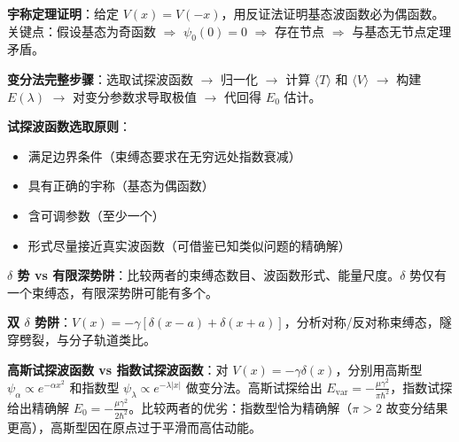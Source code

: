\begin{drillbox}[训练点与考法变体]
 \textbf{宇称定理证明}：给定 $V(x)=V(-x)$，用反证法证明基态波函数必为偶函数。关键点：假设基态为奇函数 $\Rightarrow$ $\psi_0(0)=0$ $\Rightarrow$ 存在节点 $\Rightarrow$ 与基态无节点定理矛盾。

 \textbf{变分法完整步骤}：选取试探波函数 $\to$ 归一化 $\to$ 计算 $\langle T\rangle$ 和 $\langle V\rangle$ $\to$ 构建 $E(\lambda)$ $\to$ 对变分参数求导取极值 $\to$ 代回得 $E_0$ 估计。

 \textbf{试探波函数选取原则}：
\begin{itemize}[nosep]
    \item 满足边界条件（束缚态要求在无穷远处指数衰减）
    \item 具有正确的宇称（基态为偶函数）
    \item 含可调参数（至少一个）
    \item 形式尽量接近真实波函数（可借鉴已知类似问题的精确解）
\end{itemize}

 \textbf{$\delta$ 势 vs 有限深势阱}：比较两者的束缚态数目、波函数形式、能量尺度。$\delta$ 势仅有一个束缚态，有限深势阱可能有多个。

 \textbf{双 $\delta$ 势阱}：$V(x)=-\gamma[\delta(x-a)+\delta(x+a)]$，分析对称/反对称束缚态，隧穿劈裂，与分子轨道类比。

 \textbf{高斯试探波函数 vs 指数试探波函数}：对 $V(x)=-\gamma\delta(x)$，分别用高斯型 $\psi_\alpha\propto e^{-\alpha x^2}$ 和指数型 $\psi_\lambda\propto e^{-\lambda|x|}$ 做变分法。高斯试探给出 $E_{\text{var}}=-\frac{\mu\gamma^2}{\pi\hbar^2}$，指数试探给出精确解 $E_0=-\frac{\mu\gamma^2}{2\hbar^2}$。比较两者的优劣：指数型恰为精确解（$\pi>2$ 故变分结果更高），高斯型因在原点过于平滑而高估动能。
\end{drillbox}

